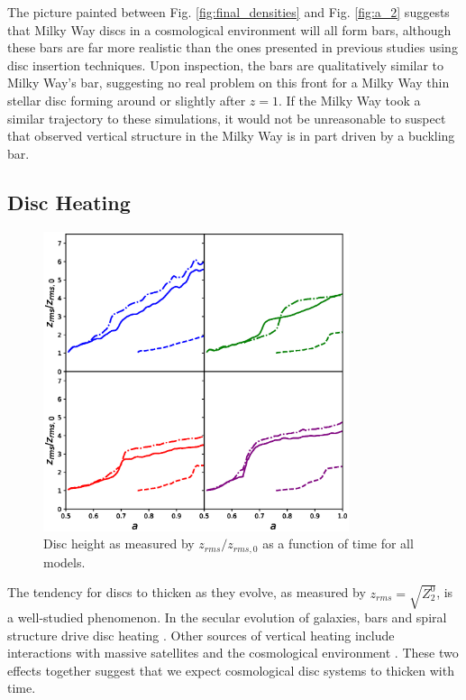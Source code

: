 The picture painted between Fig. \ref{fig:final_densities} and Fig. \ref{fig:a_2} suggests that Milky Way discs in a cosmological environment will all form bars, although these bars are far more realistic than the ones presented in previous studies using disc insertion techniques. Upon inspection, the bars are qualitatively similar to Milky Way's bar, suggesting no real problem on this front for a Milky Way thin stellar disc forming around or slightly after $z=1$. If the Milky Way took a similar trajectory to these simulations, it would not be unreasonable to suspect that observed vertical structure in the Milky Way is in part driven by a buckling bar.

\subsection{Disc Heating}
\begin{figure}
	\centering
	\includegraphics[width=0.8\textwidth]{../figures/z_rms_all_models_four_panel.eps}
	\caption{Disc height as measured by $z_{rms}/z_{rms,0}$ as a function of time for all models.} \label{fig:z_rms}
\end{figure}


The tendency for discs to thicken as they evolve, as measured by $z_{rms} = \sqrt{Z_2^0}$, is a well-studied phenomenon. In the secular evolution of galaxies, bars and spiral structure drive disc heating \citep{mcmillan_dehnen_2007,Sellwood2013}. Other sources of vertical heating include interactions with massive satellites and the cosmological environment \citep[for example]{lacey_ostriker_1985, toth_ostriker_1992, sellwood_1998, bauer2018b}. These two effects together suggest that we expect cosmological disc systems to thicken with time.


